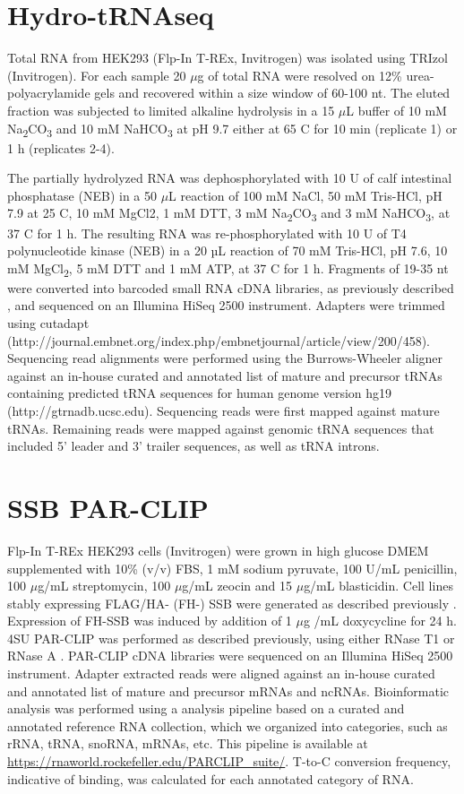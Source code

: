 \documentclass[12pt]{rockefeller}
\newcommand{\sub}[1]{\textsubscript{#1}}
\renewcommand{\deg}{\textdegree}
\begin{document}
\section{Hydro-tRNAseq}
Total RNA from HEK293 (Flp-In T-REx, Invitrogen) was isolated using TRIzol (Invitrogen). For each sample 20 $\mu$g of total RNA were resolved on 12\% urea-polyacrylamide gels and recovered within a size window of 60-100 nt. The eluted fraction was subjected to limited alkaline hydrolysis in a 15 $\mu$L buffer of 10 mM Na\textsubscript{2}CO\textsubscript{3} and 10 mM NaHCO\textsubscript{3} at pH 9.7 either at 65 \deg C for 10 min (replicate 1) or 1 h (replicates 2-4).

The partially hydrolyzed RNA was dephosphorylated with 10 U of calf intestinal phosphatase (NEB) in a 50 $\mu$L reaction of 100 mM NaCl, 50 mM Tris-HCl, pH 7.9 at 25 \deg C, 10 mM MgCl2, 1 mM DTT, 3 mM Na\sub{2}CO\sub{3} and 3 mM NaHCO\sub{3}, at 37 \deg C for 1 h. The resulting RNA was re-phosphorylated with 10 U of T4 polynucleotide kinase (NEB) in a 20 µL reaction of 70 mM Tris-HCl, pH 7.6, 10 mM MgCl\sub{2}, 5 mM DTT and 1 mM ATP, at 37 \deg C for 1 h. Fragments of 19-35 nt were converted into barcoded small RNA cDNA libraries, as previously described \cite{Hafner:2012eaa}, and sequenced on an Illumina HiSeq 2500 instrument. Adapters were trimmed using cutadapt (http://journal.embnet.org/index.php/embnetjournal/article/view/200/458). Sequencing read alignments were performed using the Burrows-Wheeler aligner against an in-house curated and annotated list of mature and precursor tRNAs containing predicted tRNA sequences for human genome version hg19 (http://gtrnadb.ucsc.edu). Sequencing reads were first mapped against mature tRNAs. Remaining reads were mapped against genomic tRNA sequences that included 5’ leader and 3’ trailer sequences, as well as tRNA introns.

\section{SSB PAR-CLIP}
Flp-In T-REx HEK293 cells (Invitrogen) were grown in high glucose DMEM supplemented with 10\% (v/v) FBS, 1 mM sodium pyruvate, 100 U/mL penicillin, 100 $\mu$g/mL streptomycin, 100 $\mu$g/mL zeocin and 15 $\mu$g/mL blasticidin. Cell lines stably expressing FLAG/HA- (FH-) SSB were generated as described previously \cite{Spitzer:2013fk}. Expression of FH-SSB was induced by addition of 1 $\mu$g /mL doxycycline for 24 h. 4SU PAR-CLIP was performed as described previously, using either RNase T1 or RNase A \cite{Garzia:2016cx}. PAR-CLIP cDNA libraries were sequenced on an Illumina HiSeq 2500 instrument. Adapter extracted reads were aligned against an in-house curated and annotated list of mature and precursor mRNAs and ncRNAs. Bioinformatic analysis was performed using a analysis pipeline based on a curated and annotated reference RNA collection, which we organized into categories, such as rRNA, tRNA, snoRNA, mRNAs, etc. This pipeline is available at \url{https://rnaworld.rockefeller.edu/PARCLIP_suite/}. T-to-C conversion frequency, indicative of binding, was calculated for each annotated category of RNA. 
\end{document}
